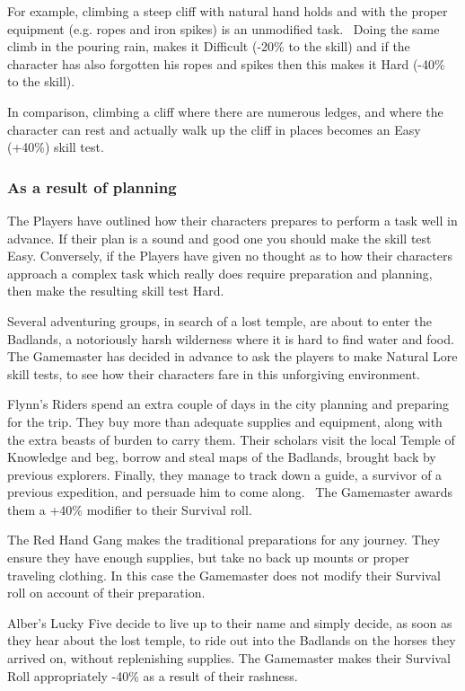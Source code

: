 For example, climbing a steep cliff with natural hand holds and with the proper equipment (e.g. ropes and iron spikes) is an unmodified task.  Doing the same climb in the pouring rain, makes it Difficult (-20\% to the skill) and if the character has also forgotten his ropes and spikes then this makes it Hard (-40\% to the skill).

In comparison, climbing a cliff where there are numerous ledges, and where the character can rest and actually walk up the cliff in places becomes an Easy (+40\%) skill test.


\subsubsection{As a result of planning}
The Players have outlined how their characters prepares to perform a task well in advance. If their plan is a sound and good one you should make the skill test Easy. Conversely, if the Players have given no thought as to how their characters approach a complex task which really does require preparation and planning, then make the resulting skill test Hard.

\begin{rpg-examplebox}
Several adventuring groups, in search of a lost temple, are about to enter the Badlands, a notoriously harsh wilderness where it is hard to find water and food. The Gamemaster has decided in advance to ask the players to make Natural Lore skill tests, to see how their characters fare in this unforgiving environment.

Flynn’s Riders spend an extra couple of days in the city planning and preparing for the trip. They buy more than adequate supplies and equipment, along with the extra beasts of burden to carry them. Their scholars visit the local Temple of Knowledge and beg, borrow and steal maps of the Badlands, brought back by previous explorers. Finally, they manage to track down a guide, a survivor of a previous expedition, and persuade him to come along.  The Gamemaster awards them a +40\% modifier to their Survival roll.

The Red Hand Gang makes the traditional preparations for any journey. They ensure they have enough supplies, but take no back up mounts or proper traveling clothing. In this case the Gamemaster does not modify their Survival roll on account of their preparation.

Alber’s Lucky Five decide to live up to their name and simply decide, as soon as they hear about the lost temple, to ride out into the Badlands on the horses they arrived on, without replenishing supplies. The Gamemaster makes their Survival Roll appropriately -40\% as a result of their rashness.
\end{rpg-examplebox}




